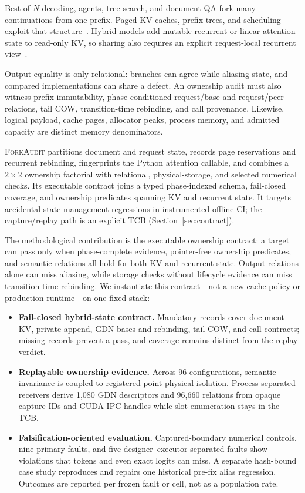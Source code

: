 \documentclass{article}
\newcommand{\method}{\textsc{ForkAudit}}
\begin{document}
Best-of-$N$ decoding, agents, tree search, and document QA fork many
continuations from one prefix.  Paged KV caches, prefix trees, and scheduling
exploit that structure~\citep{kwon2023pagedattention,zheng2024sglang,
gim2024promptcache,srivatsa2025preble}.  Hybrid models add mutable recurrent or
linear-attention state to read-only KV, so sharing also requires an explicit
request-local recurrent view~\citep{yang2025gateddeltanet,lieber2025jamba,
pan2025marconi}.

Output equality is only relational: branches can agree while aliasing state,
and compared implementations can share a defect.  An ownership audit must also
witness prefix immutability, phase-conditioned request/base and request/peer
relations, tail COW, transition-time rebinding, and call provenance.  Likewise,
logical payload, cache pages, allocator peaks, process memory, and admitted
capacity are distinct memory denominators.

\method{} partitions document and request state, records page reservations and
recurrent rebinding, fingerprints the Python attention callable, and combines
a $2\times2$ ownership factorial with relational, physical-storage, and
selected numerical checks.  Its executable contract joins a typed
phase-indexed schema, fail-closed coverage, and ownership predicates spanning
KV and recurrent state.  It targets accidental state-management regressions in
instrumented offline CI; the capture/replay path is an explicit TCB
(Section~\ref{sec:contract}).

The methodological contribution is the executable ownership contract: a
target can pass only when phase-complete evidence, pointer-free ownership
predicates, and semantic relations all hold for both KV and recurrent state.
Output relations alone can miss aliasing, while storage checks without
lifecycle evidence can miss transition-time rebinding.  We instantiate this
contract---not a new cache policy or production runtime---on one fixed stack:
\begin{itemize}
  \setlength{\itemsep}{1pt}
  \setlength{\parskip}{0pt}
  \item \textbf{Fail-closed hybrid-state contract.} Mandatory records cover
  document KV, private append, GDN bases and rebinding, tail COW, and call
  contracts; missing records prevent a pass, and coverage remains distinct
  from the replay verdict.
  \item \textbf{Replayable ownership evidence.} Across 96 configurations,
  semantic invariance is coupled to registered-point physical isolation.
  Process-separated receivers derive 1,080 GDN descriptors and 96,660 relations
  from opaque capture IDs and CUDA-IPC handles while slot enumeration stays in
  the TCB.
  \item \textbf{Falsification-oriented evaluation.} Captured-boundary numerical
  controls, nine primary faults, and five designer--executor-separated faults
  show violations that tokens and even exact logits can miss.  A separate
  hash-bound case study reproduces and repairs one historical pre-fix alias
  regression.  Outcomes are reported per frozen fault or cell, not as a
  population rate.
\end{itemize}
\end{document}
